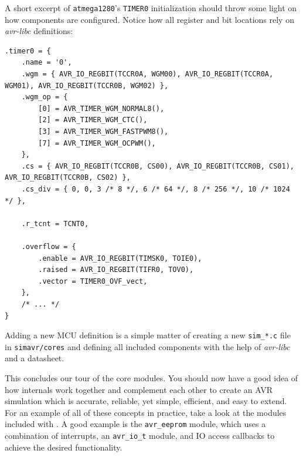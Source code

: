 A short excerpt of \verb|atmega1280|'s \lstinline|TIMER0| initialization should
throw some light on how components are configured. Notice how all register and
bit locations rely on \emph{avr-libc} definitions:

\begin{lstlisting}
.timer0 = {
    .name = '0',
    .wgm = { AVR_IO_REGBIT(TCCR0A, WGM00), AVR_IO_REGBIT(TCCR0A, WGM01), AVR_IO_REGBIT(TCCR0B, WGM02) },
    .wgm_op = {
        [0] = AVR_TIMER_WGM_NORMAL8(),
        [2] = AVR_TIMER_WGM_CTC(),
        [3] = AVR_TIMER_WGM_FASTPWM8(),
        [7] = AVR_TIMER_WGM_OCPWM(),
    },
    .cs = { AVR_IO_REGBIT(TCCR0B, CS00), AVR_IO_REGBIT(TCCR0B, CS01), AVR_IO_REGBIT(TCCR0B, CS02) },
    .cs_div = { 0, 0, 3 /* 8 */, 6 /* 64 */, 8 /* 256 */, 10 /* 1024 */ },

    .r_tcnt = TCNT0,

    .overflow = {
        .enable = AVR_IO_REGBIT(TIMSK0, TOIE0),
        .raised = AVR_IO_REGBIT(TIFR0, TOV0),
        .vector = TIMER0_OVF_vect,
    },
    /* ... */
}
\end{lstlisting}

Adding a new \ac{MCU} definition is a simple matter of creating a new \verb|sim_*.c|
file in \verb|simavr/cores| and defining all included components with the help
of \emph{avr-libc} and a datasheet.

This concludes our tour of the \simavr core modules. You should now have a
good idea of how \simavr internals work together and complement each
other to create an \ac{AVR} simulation which is accurate, reliable, yet simple,
efficient, and easy to extend. For an example of all of these concepts in practice,
take a look at the modules included with \simavr. A good example is the \verb|avr_eeprom|
module, which uses a combination of interrupts, an \lstinline|avr_io_t| module,
and \ac{IO} access callbacks to achieve the desired functionality.

